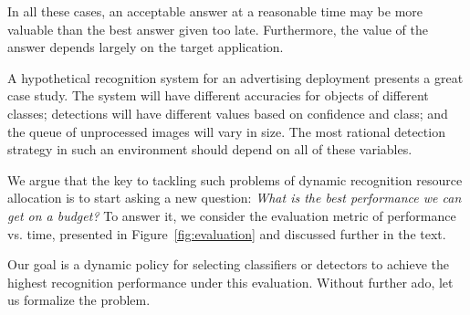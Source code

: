 In all these cases, an acceptable answer at a reasonable time may be more valuable than the best answer given too late.
Furthermore, the value of the answer depends largely on the target application.

A hypothetical recognition system for an advertising deployment presents a great case study.
The system will have different accuracies for objects of different classes; detections will have different values based on confidence and class; and the queue of unprocessed images will vary in size.
The most rational detection strategy in such an environment should depend on all of these variables.

We argue that the key to tackling such problems of dynamic recognition resource allocation is to start asking a new question:
\emph{What is the best performance we can get on a budget?}
To answer it, we consider the evaluation metric of performance vs. time, presented in Figure~\ref{fig:evaluation} and discussed further in the text.

Our goal is a dynamic policy for selecting classifiers or detectors to achieve the highest recognition performance under this evaluation.
Without further ado, let us formalize the problem.

